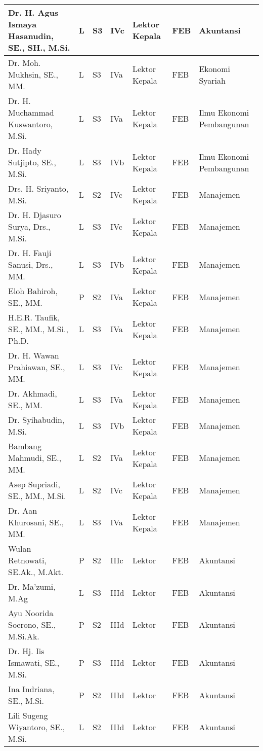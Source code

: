 \documentclass[
]{book}
\begin{document}
\begin{longtable}{l|l|l|l|l|l|l}
\hline
Dr. H. Agus Ismaya Hasanudin, SE., SH., M.Si. & L & S3 & IVc & Lektor Kepala & FEB & Akuntansi\\
\hline
Dr. Moh. Mukhsin, SE., MM. & L & S3 & IVa & Lektor Kepala & FEB & Ekonomi Syariah\\
\hline
Dr. H. Muchammad Kuswantoro, M.Si. & L & S3 & IVa & Lektor Kepala & FEB & Ilmu Ekonomi Pembangunan\\
\hline
Dr. Hady Sutjipto, SE., M.Si. & L & S3 & IVb & Lektor Kepala & FEB & Ilmu Ekonomi Pembangunan\\
\hline
Drs. H. Sriyanto, M.Si. & L & S2 & IVc & Lektor Kepala & FEB & Manajemen\\
\hline
Dr. H. Djasuro Surya, Drs., M.Si. & L & S3 & IVc & Lektor Kepala & FEB & Manajemen\\
\hline
Dr. H. Fauji Sanusi, Drs., MM. & L & S3 & IVb & Lektor Kepala & FEB & Manajemen\\
\hline
Eloh Bahiroh, SE., MM. & P & S2 & IVa & Lektor Kepala & FEB & Manajemen\\
\hline
H.E.R. Taufik, SE., MM., M.Si., Ph.D. & L & S3 & IVa & Lektor Kepala & FEB & Manajemen\\
\hline
Dr. H. Wawan Prahiawan, SE., MM. & L & S3 & IVc & Lektor Kepala & FEB & Manajemen\\
\hline
Dr. Akhmadi, SE., MM. & L & S3 & IVa & Lektor Kepala & FEB & Manajemen\\
\hline
Dr. Syihabudin, M.Si. & L & S3 & IVb & Lektor Kepala & FEB & Manajemen\\
\hline
Bambang Mahmudi, SE., MM. & L & S2 & IVa & Lektor Kepala & FEB & Manajemen\\
\hline
Asep Supriadi, SE., MM., M.Si. & L & S2 & IVc & Lektor Kepala & FEB & Manajemen\\
\hline
Dr. Aan Khurosani, SE., MM. & L & S3 & IVa & Lektor Kepala & FEB & Manajemen\\
\hline
Wulan Retnowati, SE.Ak., M.Akt. & P & S2 & IIIc & Lektor & FEB & Akuntansi\\
\hline
Dr. Ma'zumi, M.Ag & L & S3 & IIId & Lektor & FEB & Akuntansi\\
\hline
Ayu Noorida Soerono, SE., M.Si.Ak. & P & S2 & IIId & Lektor & FEB & Akuntansi\\
\hline
Dr. Hj. Iis Ismawati, SE., M.Si. & P & S3 & IIId & Lektor & FEB & Akuntansi\\
\hline
Ina Indriana, SE., M.Si. & P & S2 & IIId & Lektor & FEB & Akuntansi\\
\hline
Lili Sugeng Wiyantoro, SE., M.Si. & L & S2 & IIId & Lektor & FEB & Akuntansi\\

\end{longtable}
\end{document}
